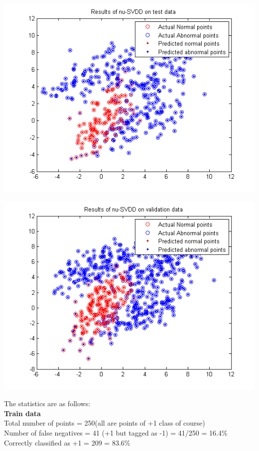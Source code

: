 \documentclass{article}
\begin{document}
\begin{center}
\includegraphics[scale=.8]{SVDD/nu/test_plot}
\end{center}
\begin{center}
\includegraphics[scale=.8]{SVDD/nu/val_plot}
\end{center}
The statistics are as follows:\\[5pt]
\textbf{Train data\\}
Total number of points = 250(all are points of +1 class of course) \\
Number of false negatives = 41 (+1 but tagged as -1) = 41/250 = 16.4\% \\  
Correctly classified as +1 = 209 = 83.6\%\\[10pt]
\end{document}
